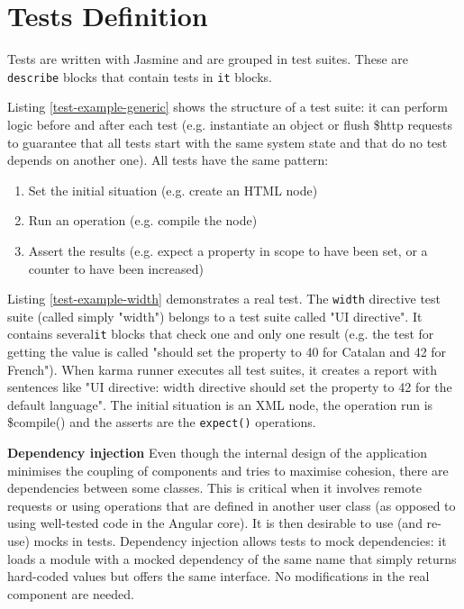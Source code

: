 \section{Tests Definition}
Tests are written with Jasmine and are grouped in test suites.
These are \texttt{describe} blocks that contain tests in \texttt{it} blocks.



Listing \ref{test-example-generic} shows the structure of a test suite:
it can perform logic before and after each test (e.g. instantiate an object or flush \$http requests to guarantee that all tests start with the same system state and that do no test depends on another one).
All tests have the same pattern:
\begin{enumerate}
\item Set the initial situation (e.g. create an \ac{HTML} node)
\item Run an operation (e.g. compile the node)
\item Assert the results (e.g. expect a property in scope to have been set, or a counter to have been increased)
\end{enumerate}



Listing \ref{test-example-width} demonstrates a real test. 
The \texttt{width} directive test suite (called simply "width") belongs to a test suite called "UI directive". 
It contains several\texttt{it} blocks that check one and only one result (e.g. the test for getting the value is called "should set the property to 40 for Catalan and 42 for French").
When karma runner executes all test suites, it creates a report with sentences like "UI directive: width directive should set the property to 42 for the default language".
The initial situation is an \ac{XML} node, the operation run is \$compile() and the asserts are the \texttt{expect()} operations.

\textbf{Dependency injection} Even though the internal design of the application minimises the coupling of components and tries to maximise cohesion, there are dependencies between some classes.
This is critical when it involves remote requests or using operations that are defined in another user class (as opposed to using well-tested code in the Angular core).
It is then desirable to use (and re-use) mocks in tests.
Dependency injection allows tests to mock dependencies: it loads a module with a mocked dependency of the same name that simply returns hard-coded values but offers the same interface.
No modifications in the real component are needed.

